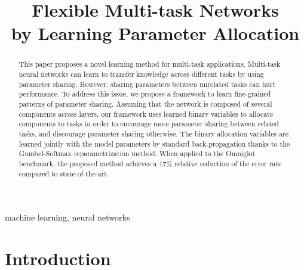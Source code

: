 \documentclass[conference]{IEEEtran}
\begin{document}
\title{Flexible Multi-task Networks\\ by Learning Parameter Allocation}

\author{
\and
{}
\and
{}
\and
{}
\and
{}
\and
{}
}



\maketitle


\begin{abstract}
This paper proposes a novel learning method for multi-task applications.
Multi-task neural networks can learn to transfer knowledge across different tasks by using parameter sharing. However, sharing parameters between unrelated tasks can hurt performance.
To address this issue, we propose a framework to learn fine-grained patterns of parameter sharing.
Assuming that the network is composed of several components across layers, our framework uses learned binary variables to allocate components to tasks in order to encourage more parameter sharing between related tasks, and discourage parameter sharing otherwise.
The binary allocation variables are learned jointly with the model parameters by standard back-propagation thanks to the Gumbel-Softmax reparametrization method.
When applied to the Omniglot benchmark, the proposed method achieves a $17\%$ relative reduction of the error rate compared to  state-of-the-art.
\end{abstract}

\begin{IEEEkeywords}
machine learning, neural networks
\end{IEEEkeywords}

\section{Introduction}\label{sec:introduction}
\end{document}
